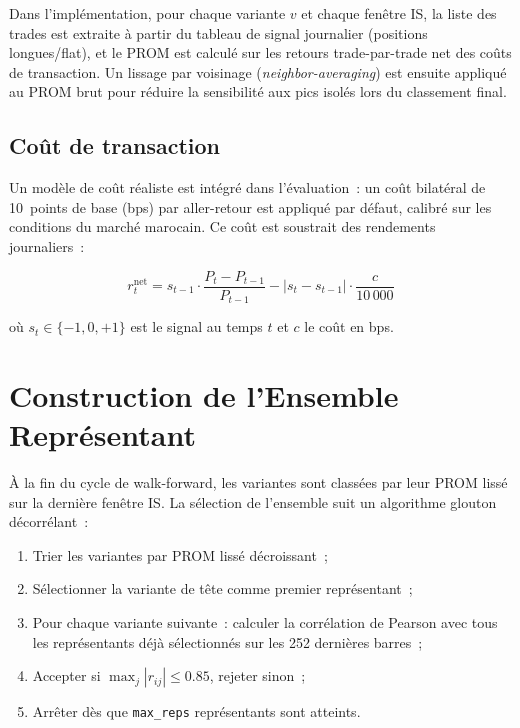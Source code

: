 Dans l'implémentation, pour chaque variante $v$ et chaque fenêtre IS,
la liste des trades est extraite à partir du tableau de signal journalier
(positions longues/flat), et le PROM est calculé sur les retours trade-par-trade
net des coûts de transaction. Un lissage par voisinage (\textit{neighbor-averaging})
est ensuite appliqué au PROM brut pour réduire la sensibilité aux pics isolés
lors du classement final.

\subsection{Coût de transaction}

Un modèle de coût réaliste est intégré dans l'évaluation~: un coût bilatéral
de 10~points de base (bps) par aller-retour est appliqué par défaut, calibré
sur les conditions du marché marocain. Ce coût est soustrait des rendements
journaliers~:

\begin{equation}
r_t^{\text{net}} = s_{t-1} \cdot \frac{P_t - P_{t-1}}{P_{t-1}} -
\left|s_t - s_{t-1}\right| \cdot \frac{c}{10\,000}
\label{eq:cost_model}
\end{equation}

où $s_t \in \{-1, 0, +1\}$ est le signal au temps $t$ et $c$ le coût en bps.

\section{Construction de l'Ensemble Représentant}
\label{sec:wfo_ensemble}

À la fin du cycle de walk-forward, les variantes sont classées par leur PROM
lissé sur la dernière fenêtre IS. La sélection de l'ensemble suit un algorithme
glouton décorrélant~:

\begin{enumerate}
    \item Trier les variantes par PROM lissé décroissant~;
    \item Sélectionner la variante de tête comme premier représentant~;
    \item Pour chaque variante suivante~: calculer la corrélation de Pearson avec
    tous les représentants déjà sélectionnés sur les 252 dernières barres~;
    \item Accepter si $\max_j |r_{ij}| \leq 0.85$, rejeter sinon~;
    \item Arrêter dès que \texttt{max\_reps} représentants sont atteints.
\end{enumerate}

